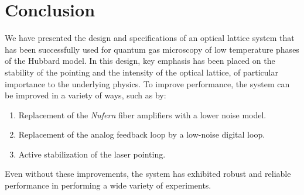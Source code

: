 \documentclass[twocolumn,aps,pra,showpacs,preprintnumbers,bibnotes]{revtex4-1}
\begin{document}
\section{Conclusion}
We have presented the design and specifications of an optical lattice system that has been successfully used for quantum gas microscopy of low temperature phases of the Hubbard model.
In this design, key emphasis has been placed on the stability of the pointing and the intensity of the optical lattice, of particular importance to the underlying physics.
To improve performance, the system can be improved in a variety of ways, such as by:
\begin{enumerate}
  \item Replacement of the \textit{Nufern} fiber amplifiers with a lower noise model.
  \item Replacement of the analog feedback loop by a low-noise digital loop.
  \item Active stabilization of the laser pointing.
\end{enumerate}
Even without these improvements, the system has exhibited robust and reliable performance in performing a wide variety of experiments.


\end{document}
